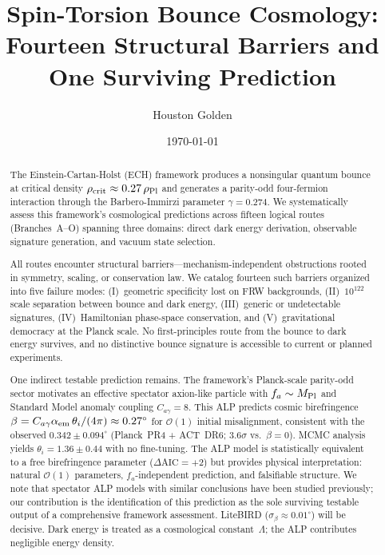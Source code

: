 \documentclass[aps,prd,twocolumn,superscriptaddress,showpacs,preprintnumbers,nofootinbib,longbibliography,floatfix]{revtex4-2}
\newcommand{\MPl}{M_{\rm Pl}}
\newcommand{\rhocrit}{\rho_{\rm crit}}
\newcommand{\rhoPl}{\rho_{\rm Pl}}
\begin{document}

\title{Spin-Torsion Bounce Cosmology:\\
Fourteen Structural Barriers and One Surviving Prediction}

\author{Houston Golden}

\date{\today}

\begin{abstract}
The Einstein-Cartan-Holst (ECH) framework produces a nonsingular quantum
bounce at critical density $\rhocrit \approx 0.27\,\rhoPl$ and generates a
parity-odd four-fermion interaction through the Barbero-Immirzi parameter
$\gamma = 0.274$.  We systematically assess this framework's cosmological
predictions across fifteen logical routes (Branches~A--O) spanning three
domains: direct dark energy derivation, observable signature generation, and
vacuum state selection.

All routes encounter structural barriers---mechanism-independent obstructions
rooted in symmetry, scaling, or conservation law.  We catalog fourteen such
barriers organized into five failure modes: (I)~geometric specificity lost on
FRW backgrounds, (II)~$10^{122}$ scale separation between bounce and dark
energy, (III)~generic or undetectable signatures, (IV)~Hamiltonian phase-space
conservation, and (V)~gravitational democracy at the Planck scale.  No
first-principles route from the bounce to dark energy survives, and no
distinctive bounce signature is accessible to current or planned experiments.

One indirect testable prediction remains.  The framework's Planck-scale
parity-odd sector motivates an effective spectator axion-like particle with
$f_a \sim \MPl$ and Standard Model anomaly coupling $C_{a\gamma} = 8$.  This
ALP predicts cosmic birefringence
$\beta = C_{a\gamma}\alpha_{\rm em}\,\theta_i/(4\pi) \approx 0.27^\circ$ for
$\mathcal{O}(1)$ initial misalignment, consistent with the observed
$0.342 \pm 0.094^\circ$ (Planck~PR4 + ACT~DR6; $3.6\sigma$ vs.\ $\beta = 0$).
MCMC analysis yields $\theta_i = 1.36 \pm 0.44$ with no fine-tuning.  The ALP
model is statistically equivalent to a free birefringence parameter
($\Delta\mathrm{AIC} = +2$) but provides physical interpretation: natural
$\mathcal{O}(1)$ parameters, $f_a$-independent prediction, and falsifiable
structure.  We note that spectator ALP models with similar conclusions have
been studied previously; our contribution is the identification of this
prediction as the sole surviving testable output of a comprehensive framework
assessment.  LiteBIRD ($\sigma_\beta \approx 0.01^\circ$) will be decisive.
Dark energy is treated as a cosmological constant~$\Lambda$; the ALP
contributes negligible energy density.
\end{abstract}
\end{document}
